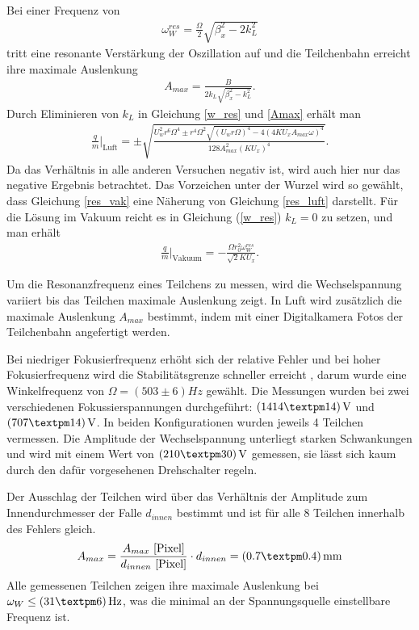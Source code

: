 \documentclass[a4paper,12pt]{article}
\begin{document}
Bei einer Frequenz von
\begin{align}\label{w_res}
	\omega^{res}_W = \frac{\Omega}{2}\sqrt{\beta^{2}_x-2k^{2}_L}
\end{align}
tritt eine resonante Verstärkung der Oszillation auf und die Teilchenbahn erreicht ihre maximale Auslenkung
\begin{align}\label{Amax}
	A_{max} = \frac{B}{2k_L\sqrt{\beta^{2}_x-k^{2}_L}}.
\end{align}
Durch Eliminieren von $k_L$ in Gleichung \ref{w_res} und \ref{Amax} erhält man
\begin{align}\label{res_luft}
	\frac{q}{m}|_{\text{Luft}} = ±\sqrt{
		\frac{
			U_w^2r^6Ω^4 ± r^4Ω^2\sqrt{
				(U_wrΩ)^4 - 4(4KU_xA_{max}ω)^4
			} %
		}{
			128A_{max}^2(KU_x)^4
		} %
	}. %
\end{align}
Da das Verhältnis in  alle anderen Versuchen negativ ist, wird auch hier nur das negative Ergebnis betrachtet.
Das Vorzeichen unter der Wurzel wird so gewählt, dass Gleichung \ref{res_vak} eine Näherung von Gleichung \ref{res_luft} darstellt.
Für die Lösung im Vakuum reicht es in Gleichung (\ref{w_res}) $k_L=0$ zu setzen, und man erhält
\begin{align}\label{res_vak}
	\frac{q}{m}|_\text{Vakuum} = -\frac{\Omega r^{2}_0 \omega^{res}_W}{\sqrt{2} K U_x}.
\end{align}

Um die Resonanzfrequenz eines Teilchens zu messen, wird die Wechselspannung variiert bis das Teilchen maximale Auslenkung zeigt.
In Luft wird zusätzlich die maximale Auslenkung $A_{max}$ bestimmt, indem mit einer Digitalkamera Fotos der Teilchenbahn angefertigt werden.

Bei niedriger Fokusierfrequenz erhöht sich der relative Fehler und bei hoher Fokusierfrequenz wird die Stabilitätsgrenze schneller erreicht
, darum wurde eine Winkelfrequenz von $Ω = (503±6)\unit{Hz}$ gewählt.
Die Messungen wurden bei zwei verschiedenen Fokussierspannungen durchgeführt: $\unit[(1414±14)]{V}$ und $\unit[(707±14)]{V}$.
In beiden Konfigurationen wurden jeweils 4 Teilchen vermessen.
Die Amplitude der Wechselspannung unterliegt starken Schwankungen und wird mit einem Wert von
$ \unit[( 210 ± 30 )]{V} $ gemessen, sie lässt sich kaum durch den dafür vorgesehenen Drehschalter regeln.

Der Ausschlag der Teilchen wird über das Verhältnis der Amplitude zum Innendurchmesser der Falle $d_{innen}$ bestimmt und ist für alle 8 Teilchen innerhalb des Fehlers gleich.
$$A_{max} = \frac{A_{max}\text{ [Pixel]}}{d_{innen}\text{ [Pixel]}} \cdot d_{innen}= \unit[( 0.7 ± 0.4 )]{mm} $$
Alle gemessenen Teilchen zeigen ihre maximale Auslenkung bei $\omega_W \leq \unit[(31±6)]{Hz}$,
was die minimal an der Spannungsquelle einstellbare Frequenz ist.
\end{document}
